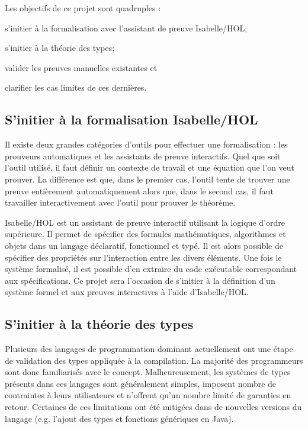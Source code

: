 \documentclass[a4paper, oneside, 12pt, titlepage]{article}
\begin{document}

Les objectifs de ce projet sont quadruples :
\begin{enumerate*}[label=\arabic*)]
  \item s'initier à la formalisation avec l'assistant de preuve Isabelle/HOL;
  \item s'initier à la théorie des types;
  \item valider les preuves manuelles existantes et
  \item clarifier les cas limites de ces dernières.
\end{enumerate*}

\subsection{S'initier à la formalisation Isabelle/HOL}

Il existe deux grandes catégories d'outils pour effectuer une formalisation : les prouveurs
automatiques et les assistants de preuve interactifs. Quel que soit l'outil utilisé, il faut définir
un contexte de travail et une équation que l'on veut prouver. La différence est que, dans le premier
cas, l'outil tente de trouver une preuve entièrement automatiquement alors que, dans le second
cas, il faut travailler interactivement avec l'outil pour prouver le théorème.

Isabelle/HOL est un assistant de preuve interactif utilisant la logique d'ordre supérieure. Il
permet de spécifier des formules mathématiques, algorithmes et objets dans un langage déclaratif,
fonctionnel et typé. Il est alors possible de spécifier des propriétés sur l'interaction entre les
divers éléments. Une fois le système formalisé, il est possible d'en extraire du code exécutable
correspondant aux spécifications. Ce projet sera l'occasion de s'initier à la définition d'un
système formel et aux preuves interactives à l'aide d'Isabelle/HOL.

\subsection{S'initier à la théorie des types}

Plusieurs des langages de programmation dominant actuellement ont une étape de validation des types
appliquée à la compilation. La majorité des programmeurs sont donc familiarisés avec le concept.
Malheureusement, les systèmes de types présents dans ces langages sont généralement simples,
imposent nombre de contraintes à leurs utilisateurs et n'offrent qu'un nombre limité de garanties en
retour. Certaines de ces limitations ont été mitigées dans de nouvelles versions du langage (e.g.
l'ajout des types et fonctions génériques en Java).
\end{document}

